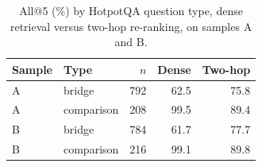 \begin{table}[t]
\centering
\small
\caption{All@5 (\%) by HotpotQA question type, dense retrieval versus two-hop re-ranking, on samples A and B.}
\label{tab:bytype}
\begin{tabular}{llrrr}
\toprule
Sample & Type & $n$ & Dense & Two-hop \\
\midrule
A & bridge & 792 & 62.5 & 75.8 \\
A & comparison & 208 & 99.5 & 89.4 \\
B & bridge & 784 & 61.7 & 77.7 \\
B & comparison & 216 & 99.1 & 89.8 \\
\bottomrule
\end{tabular}
\end{table}